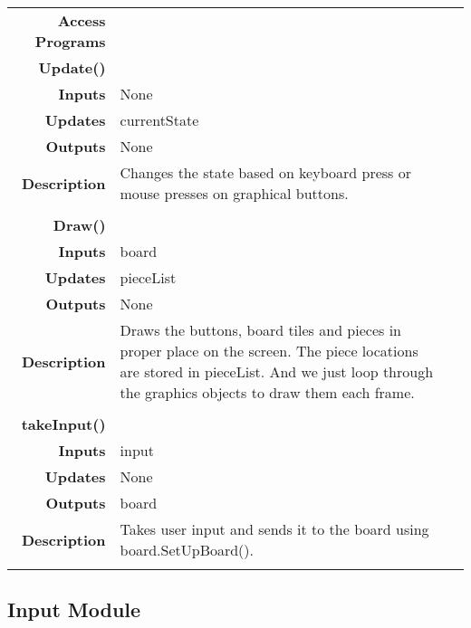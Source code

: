 \documentclass[10pt]{article}
\makeatletter
\newcommand{\CustomLabel}[1]{\Hy@raisedlink{\hypertarget{#1}{}}\label{#1}}
\makeatother
\begin{document}
\begin{tabularx}{\linewidth}{ >{\bfseries}r Xp{5cm} }
            Access Programs & \begin{tabular}[t]{@{} l p{8cm}} 
                                     & \\
                                    \bf{Update()} & \\
                                    Inputs &  None \\
                                    Updates & currentState \\
                                    Outputs & None \\
                                    Description & Changes the state based on keyboard press or mouse presses on graphical buttons.\\
                                     & \\
                                    \bf{Draw()} & \\
                                    Inputs & board \\
                                    Updates & pieceList \\
                                    Outputs & None \\
                                    Description & Draws the buttons, board tiles and pieces in proper place on the screen. The piece locations are stored in pieceList. And we just loop through the graphics objects to draw them each frame. \\
                                     & \\
                                    \bf{takeInput()} & \\
                                    Inputs & input \\
                                    Updates & None \\
                                    Outputs & board \\ 
                                    Description & Takes user input and sends it to the board using board.SetUpBoard().\\
                              \end{tabular} \\
                              
        \end{tabularx}


    \subsection{Input Module}\CustomLabel{mis:Input}
\end{document}
